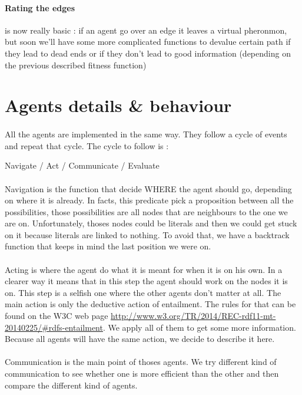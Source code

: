 \documentclass{article}
\begin{document}
			\paragraph{Rating the edges} is now really basic : if an agent go over an edge it leaves a virtual pheronmon,
				but soon we'll have some more complicated functions to devalue certain path if they lead to dead ends or
				if they don't lead to good information (depending on the previous described fitness function)

\section{Agents details \& behaviour}
	\paragraph{}
		All the agents are implemented in the same way.
		They follow a cycle of events and repeat that cycle.
		The cycle to follow is :
	\begin{center}
		Navigate / Act / Communicate / Evaluate
	\end{center}
	\paragraph{}
		Navigation is the function that decide WHERE the agent should go, depending on where it is already.
		In facts, this predicate pick a proposition between all the possibilities,
		those possibilities are all nodes that are neighbours to the one we are on.
		Unfortunately, thoses nodes could be literals and then we could get stuck on it because literals are linked to nothing.
		To avoid that, we have a backtrack function that keeps in mind the last position we were on.
	\paragraph{}
		Acting is where the agent do what it is meant for when it is on his own.
		In a clearer way it means that in this step the agent should work on the nodes it is on.
		This step is a selfish one where the other agents don't matter at all.
		The main action is only the deductive action of entailment.
		The rules for that can be found on the W3C web page \url{http://www.w3.org/TR/2014/REC-rdf11-mt-20140225/#rdfs-entailment}.
		We apply all of them to get some more information.
		Because all agents will have the same action, we decide to describe it here.
	\paragraph{}
		Communication is the main point of thoses agents.
		We try different kind of communication to see whether one is more efficient than the other
		and then compare the different kind of agents.
\end{document}
